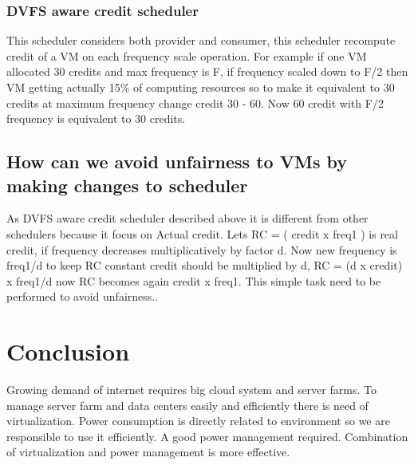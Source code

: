 \documentclass[seminar,twoside]{iitbreport}
\begin{document}
\subsubsection{ DVFS aware credit scheduler}
This scheduler considers both provider and consumer, this scheduler recompute credit of a VM on each frequency scale operation.
For example if one VM allocated 30 credits and max frequency is F, if frequency scaled down to F/2 then VM getting actually 15\% of computing
resources so to make it equivalent to 30 credits at maximum frequency change credit 30 - 60. Now 60 credit with F/2 frequency is 
equivalent to 30 credits\cite{dvfs}.
\subsection{How can we avoid unfairness to VMs by making changes to scheduler}
As DVFS aware credit scheduler described above it is different from other schedulers because it focus on Actual credit.
Lets RC = ( credit x freq1 ) is real credit, if frequency decreases multiplicatively by factor d.
Now new frequency is freq1/d to keep RC constant credit should be multiplied by d, RC = (d x credit) x freq1/d 
now RC becomes again credit x freq1. This simple task need to be performed to avoid unfairness.\cite{dvfs}.
\section{Conclusion}
Growing demand of internet requires big cloud system and server farms.
To manage server farm and data centers easily and efficiently there is need of virtualization.
Power consumption is directly related to environment so we are responsible to use it efficiently. A good power management required.
Combination of virtualization and power management is more effective.


\end{document}
